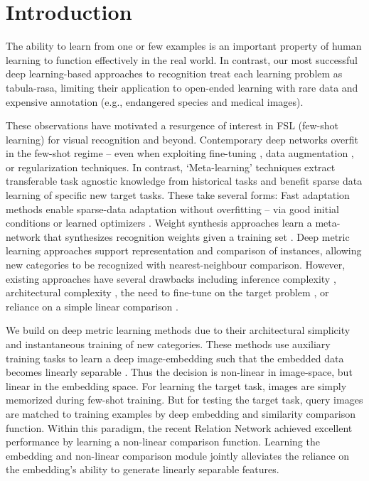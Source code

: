 \documentclass[conference]{IEEEtran}
\begin{document}
\section{Introduction}
The ability to learn from one or few examples is an important property of human learning to function effectively in the real world. In contrast, our most successful deep learning-based approaches to recognition \cite{krizhevsky2012imagenet, he2016deep,hu2018senet} treat each learning problem as tabula-rasa, limiting their application to open-ended learning with rare data and expensive annotation (e.g., endangered species and medical images).

These observations have motivated a resurgence of interest in FSL (few-shot learning) for visual recognition \cite{vinyals2016matching,finn2017model,snell2017prototypical,qiao2017few} and beyond.  
Contemporary deep networks overfit in the few-shot regime -- even when exploiting fine-tuning \cite{yosinski2014howTransferable}, data augmentation \cite{krizhevsky2012imagenet}, or regularization \cite{srivastava2014dropout} techniques. In contrast, `Meta-learning' techniques extract transferable task agnostic knowledge from historical tasks and benefit sparse data learning of specific new target tasks. These take several forms: Fast adaptation methods enable sparse-data adaptation without overfitting -- via good initial conditions \cite{finn2017model} or learned optimizers \cite{ravi2017optimization}. Weight synthesis approaches learn a meta-network that synthesizes recognition weights given a training set  \cite{bertinetto2016feedForwardOneShot,mishra2018simple}. Deep metric learning approaches support representation \cite{koch2015siamese} and comparison \cite{vinyals2016matching,snell2017prototypical} of instances, allowing new categories to be recognized with nearest-neighbour comparison. However, existing approaches have several drawbacks including inference complexity \cite{lake2015ppi,lee2019meta}, architectural complexity \cite{munkhdalai2017meta}, the need to fine-tune on the target problem \cite{finn2017model}, or reliance on a simple linear comparison  \cite{vinyals2016matching,snell2017prototypical,lee2019meta}. 

We build on deep metric learning methods due to their architectural simplicity and instantaneous training of new categories. These methods use auxiliary training tasks to learn a deep image-embedding such that the embedded data becomes linearly separable \cite{koch2015siamese,vinyals2016matching,snell2017prototypical}. Thus the decision is non-linear in image-space, but linear in the embedding space. For learning the target task, images are simply memorized during few-shot training. But for testing the target task, query images are matched to training examples by deep embedding and similarity comparison function. Within this paradigm, the recent Relation Network \cite{yang2018learning} achieved excellent performance by learning a non-linear comparison function. Learning the embedding and non-linear comparison module jointly alleviates the reliance on the embedding's ability to generate linearly separable features.
\end{document}
